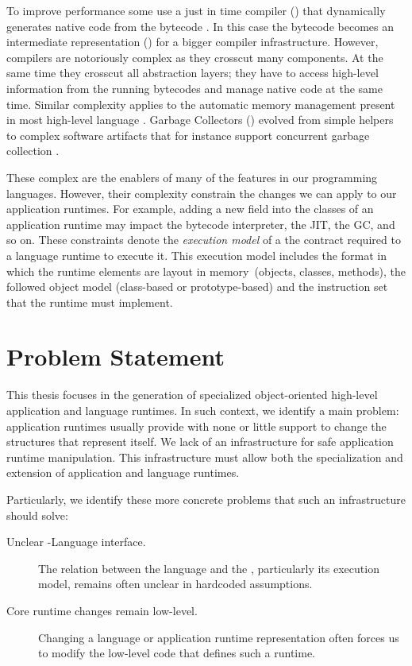 
To improve performance some \VMs use a just in time compiler (\JIT) that dynamically generates native code from the bytecode \cite{Deut84a}.
In this case the bytecode becomes an intermediate representation (\IR) for a bigger compiler infrastructure.
However, \JIT compilers are notoriously complex as they crosscut many \VM components.
At the same time they crosscut all abstraction layers; they have to access high-level information from the running bytecodes and manage native code at the same time.
Similar complexity applies to the automatic memory management present in most high-level language \VMs.
Garbage Collectors (\GC) evolved from simple helpers to complex software artifacts that for instance support concurrent garbage collection \cite{Clic05a}.

These complex \VMs are the enablers of many of the features in our programming languages. However, their complexity constrain the changes we can apply to our application runtimes. For example, adding a new field into the classes of an application runtime may impact the bytecode interpreter, the JIT, the GC, and so on. These constraints denote the \emph{execution model} of a \VM \ie the contract required to a language runtime to execute it. This execution model includes the format in which the runtime elements are layout in memory~(objects, classes, methods), the followed object model (\eg class-based or prototype-based) and the instruction set that the runtime must implement.

\section{Problem Statement}

This thesis focuses in the generation of specialized object-oriented high-level application and language runtimes. In such context, we identify a main problem: application runtimes usually provide with none or little support to change the structures that represent itself. We lack of an infrastructure for safe application runtime manipulation. This infrastructure must allow both the specialization and extension of application and language runtimes.

Particularly, we identify these more concrete problems that such an infrastructure should solve:
\begin{description}
\item[Unclear \VM-Language interface.] The relation between the language and the \VM, particularly its execution model, remains often unclear in \VM hardcoded assumptions.
\item[Core runtime changes remain low-level.] Changing a language or application runtime representation often forces us to modify the low-level code that defines such a runtime.
\end{description}


